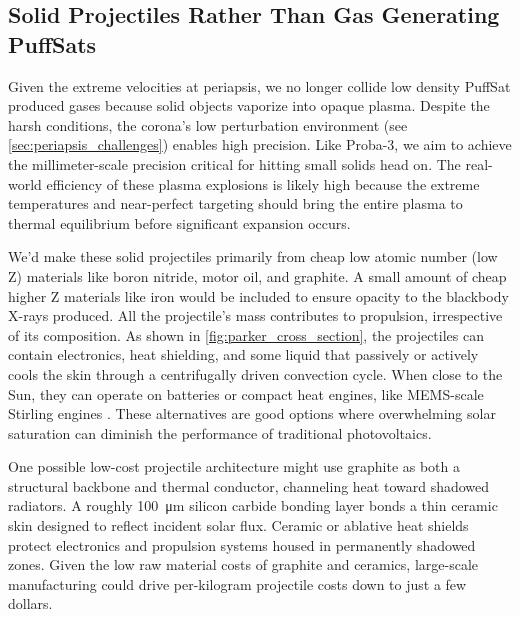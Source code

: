 \documentclass{article}
\begin{document}
{\subsection{Solid Projectiles Rather Than Gas Generating PuffSats}\label{sec:solid_PuffSats}
Given the extreme velocities at periapsis, we no longer collide low density PuffSat produced gases because solid objects vaporize into opaque plasma.   Despite the harsh conditions, the corona's low perturbation environment (see \autoref{sec:periapsis_challenges}) enables high precision.  Like Proba-3, we aim to achieve the millimeter-scale precision critical for hitting small solids head on.   The real-world efficiency of these plasma explosions is likely high because the extreme temperatures and near-perfect targeting should bring the entire plasma to thermal equilibrium before significant expansion occurs.

We'd make these solid projectiles primarily from cheap low atomic number (low Z) materials like boron nitride, motor oil, and graphite.  A small amount of cheap higher Z materials like iron would be included to ensure opacity to the blackbody X-rays produced.  
All the projectile's mass contributes to propulsion, irrespective of its composition.  As shown in \autoref{fig:parker_cross_section}, the projectiles can contain electronics, heat shielding, and some liquid that passively or actively cools the skin through a centrifugally driven convection cycle.    When close to the Sun, they can operate on batteries or compact heat engines, like MEMS-scale Stirling engines \cite{mems_stirling_engine}. These alternatives are good options  where overwhelming solar saturation can diminish the performance of traditional photovoltaics.

One possible low-cost projectile architecture might use graphite as both a structural backbone and thermal conductor, channeling heat toward shadowed radiators. A roughly \SI{100}{\micro\meter} silicon carbide bonding layer bonds a thin ceramic skin designed to reflect incident solar flux. Ceramic or ablative heat shields protect electronics and propulsion systems housed in permanently shadowed zones. Given the low raw material costs of graphite and ceramics, large-scale manufacturing could drive per-kilogram projectile costs down to just a few dollars.

}
\end{document}
